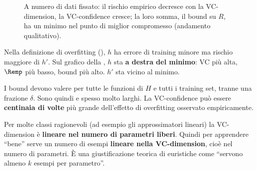 \begin{figure}[ht]
\centering
{}
\caption{A numero di dati fissato: il rischio empirico decresce con la VC-dimension, la VC-confidence cresce; la
loro somma, il bound su $R$, ha un minimo nel punto di miglior compromesso (andamento qualitativo).}
\label{fig:vc-bound}
\end{figure}

\begin{esempio}[Ritrovare $h$ e $h'$]
Nella definizione di overfitting (), $h$ ha errore di training minore ma rischio maggiore di
$h'$. Sul grafico della , $h$ sta \textbf{a destra del minimo}: VC più alta, $\Remp$ più
basso, bound più alto. $h'$ sta vicino al minimo.
\end{esempio}

\begin{attenzione}
I bound devono valere per tutte le funzioni di $H$ e tutti i training set, tranne una frazione $\delta$. Sono
quindi  e spesso molto larghi. La VC-confidence può essere \textbf{centinaia di volte} più grande
dell'effetto di overfitting osservato empiricamente.
\end{attenzione}

\begin{idea}
Per molte classi ragionevoli (ad esempio gli approssimatori lineari) la VC-dimension è \textbf{lineare nel numero
di parametri liberi}. Quindi per apprendere ``bene'' serve un numero di esempi \textbf{lineare nella
VC-dimension}, cioè nel numero di parametri. È una giustificazione teorica di euristiche come ``servono almeno
$k$ esempi per parametro''.
\end{idea}

